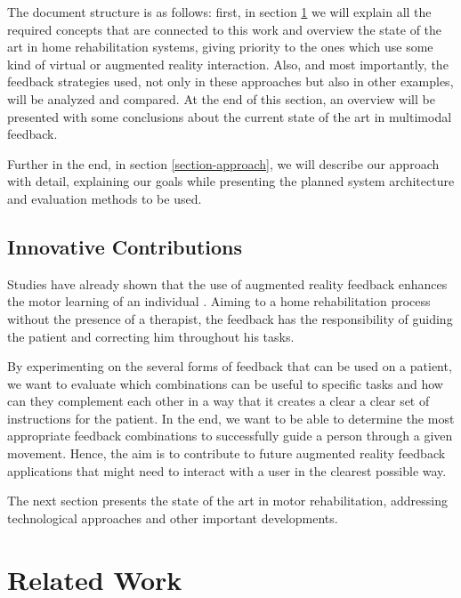 \documentclass[runningheads]{llncs}
\begin{document}
The document structure is as follows: first, in section \ref{section-related} we will 
explain all the required concepts that are connected to 
this work and overview the state of the art in home rehabilitation systems, giving priority to 
the ones which use some kind of virtual or augmented reality interaction. Also, and most importantly, the feedback strategies used,
not only in these approaches but also in other examples, will be analyzed and compared. 
At the end of this section, an overview will be presented with some conclusions about the current state of the art in multimodal feedback.

Further in the end, in section \ref{section-approach}, we will describe our approach with detail, explaining our goals 
while presenting the planned system architecture and evaluation methods to be used.



\subsection{Innovative Contributions}

Studies have already shown that the use of augmented reality feedback enhances the motor learning of an individual \cite{Sigrist2013}.
Aiming to a home rehabilitation process without the presence of a therapist,
the feedback has the responsibility of guiding the patient and correcting him throughout his tasks.

By experimenting on the several forms of feedback that can be used on a patient, we want to evaluate which 
combinations can be useful to specific tasks and how can they complement each other 
in a way that it creates a clear a clear set of instructions for the patient. 
In the end, we want to be able to determine the most appropriate feedback combinations to successfully guide a person through a given movement.
Hence, the aim is to contribute to future augmented reality feedback applications that might need to interact with a user in the clearest possible way.

The next section presents the state of the art in motor rehabilitation, addressing technological approaches and other important developments.
\raggedbottom
\section{Related Work}
\label{section-related}
\end{document}
